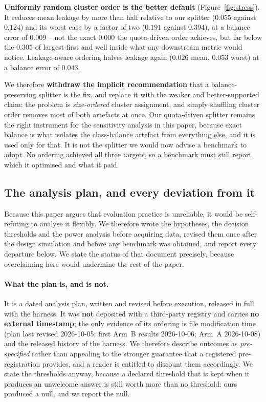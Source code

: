 \documentclass[11pt,a4paper]{article}
\begin{document}
\textbf{Uniformly random cluster order is the better default} (Figure~\ref{fig:stress}).
It reduces mean leakage by
more than half relative to our splitter ($0.055$ against $0.124$) and its worst case by a
factor of two ($0.191$ against $0.394$), at a balance error of $0.009$ -- not the exact
$0.000$ the quota-driven order achieves, but far below the $0.305$ of largest-first and well
inside what any downstream metric would notice. Leakage-aware ordering halves leakage again
($0.026$ mean, $0.053$ worst) at a balance error of $0.043$.

We therefore \textbf{withdraw the implicit recommendation} that a balance-preserving
splitter is the fix, and replace it with the weaker and better-supported claim: the problem
is \emph{size-ordered} cluster assignment, and simply shuffling cluster order removes most
of both artefacts at once. Our quota-driven splitter remains the right instrument for the
sensitivity analysis in this paper, because exact balance is what isolates the
class-balance artefact from everything else, and it is used only for that. It is not the
splitter we would now advise a benchmark to adopt. No ordering achieved all three targets,
so a benchmark must still report which it optimised and what it paid.

\subsection{The analysis plan, and every deviation from it}
\label{sec:prereg}

Because this paper argues that evaluation practice is unreliable, it would be
self-refuting to analyse it flexibly. We therefore wrote the hypotheses, the decision
thresholds and the power analysis before acquiring data, revised them once after the
design simulation and before any benchmark was obtained, and report every departure
below. We state the status of that document precisely, because overclaiming here would
undermine the rest of the paper.

\paragraph{What the plan is, and is not.} It is a dated analysis plan, written and revised
before execution, released in full with the harness. It was \textbf{not} deposited with a
third-party registry and carries \textbf{no external timestamp}; the only evidence of its
ordering is file modification time (plan last revised 2026-10-05; first Arm~B results
2026-10-06; Arm~A 2026-10-08) and the released history of the harness. We therefore
describe outcomes as \emph{pre-specified} rather than appealing to the stronger guarantee
that a registered pre-registration provides, and a reader is entitled to discount them
accordingly. We state the thresholds anyway, because a declared threshold that is kept
when it produces an unwelcome answer is still worth more than no threshold: ours produced
a null, and we report the null.
\end{document}
